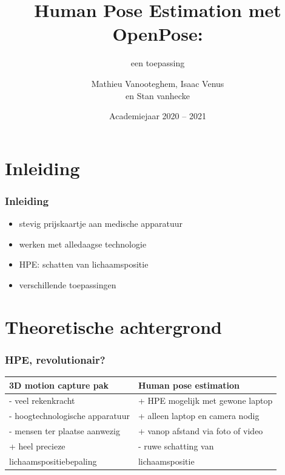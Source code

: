 \documentclass
   [kulak] %
   {kulakbeamer}
\title[HPE]{Human Pose Estimation met OpenPose:}
\subtitle{een toepassing}
\author[Korte naam]{Mathieu Vanooteghem, Isaac Venus \\ 
	en Stan vanhecke}
\institute[Kulak]{KU Leuven Kulak}
\date{Academiejaar 2020 -- 2021}
\begin{document}
\begin{titleframe}
\titlepage
\end{titleframe}

\begin{outlineframe}[Overzicht]
\tableofcontents
\end{outlineframe}


\section{Inleiding}

\begin{frame}
\frametitle{Inleiding}
	\begin{itemize}
		\item stevig prijskaartje aan medische apparatuur
		\item werken met alledaagse technologie
		\item HPE: schatten van lichaamspositie
		\item verschillende toepassingen
	\end{itemize}
\end{frame}



\section[Korte titel]{Theoretische achtergrond}

\begin{frame}
\frametitle{HPE, revolutionair?}
\begin{center}
	\begin{tabular}{l|l} 
		\textbf{3D motion capture pak} & \textbf{Human pose estimation}\\
		\hline
		- veel rekenkracht & + HPE mogelijk met gewone laptop\\
		- hoogtechnologische apparatuur & + alleen laptop en camera nodig\\
		- mensen ter plaatse aanwezig & + vanop afstand via foto of video\\
		+ heel precieze & - ruwe schatting van \\
		  lichaamspositiebepaling & lichaamspositie\\
	\end{tabular}
\end{center}
\end{frame}
\end{document}
